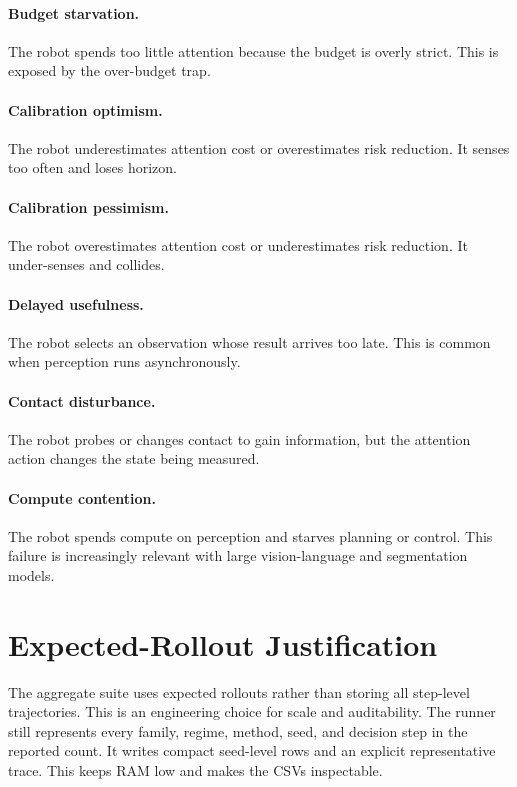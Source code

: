 \documentclass{article}
\begin{document}
\paragraph{Budget starvation.}
The robot spends too little attention because the budget is overly strict. This
is exposed by the over-budget trap.

\paragraph{Calibration optimism.}
The robot underestimates attention cost or overestimates risk reduction. It
senses too often and loses horizon.

\paragraph{Calibration pessimism.}
The robot overestimates attention cost or underestimates risk reduction. It
under-senses and collides.

\paragraph{Delayed usefulness.}
The robot selects an observation whose result arrives too late. This is common
when perception runs asynchronously.

\paragraph{Contact disturbance.}
The robot probes or changes contact to gain information, but the attention
action changes the state being measured.

\paragraph{Compute contention.}
The robot spends compute on perception and starves planning or control. This
failure is increasingly relevant with large vision-language and segmentation
models.

\section{Expected-Rollout Justification}

The aggregate suite uses expected rollouts rather than storing all step-level
trajectories. This is an engineering choice for scale and auditability. The
runner still represents every family, regime, method, seed, and decision step
in the reported count. It writes compact seed-level rows and an explicit
representative trace. This keeps RAM low and makes the CSVs inspectable.
\end{document}
